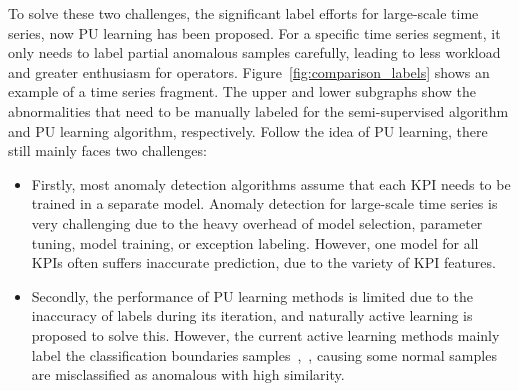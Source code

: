 To solve these two challenges, the significant label efforts for large-scale time series, now PU learning has been proposed.
For a specific time series segment, it only needs to label partial anomalous samples carefully, %
leading to less workload and greater enthusiasm for operators.
Figure~\ref{fig:comparison_labels} shows an example of a time series fragment. The upper and lower subgraphs show the abnormalities that need to be manually labeled for the semi-supervised algorithm and PU learning algorithm, respectively.
Follow the idea of PU learning, there still mainly faces two challenges:
\begin{itemize}
\item Firstly, most anomaly detection algorithms assume that each KPI needs to be trained in a separate model. Anomaly detection for large-scale time series is very challenging due to the heavy overhead of model selection, parameter tuning, model training, or exception labeling. However, one model for all KPIs often suffers inaccurate prediction, due to the variety of KPI features.
\item Secondly,
the performance of PU learning methods is limited due to the inaccuracy of labels during its iteration, and naturally active learning is proposed to solve this.
However, the current active learning methods mainly label the classification boundaries samples~\cite{activelearning2015},~\cite{6747346}, causing some normal samples are misclassified as anomalous with high similarity. 
\end{itemize}


